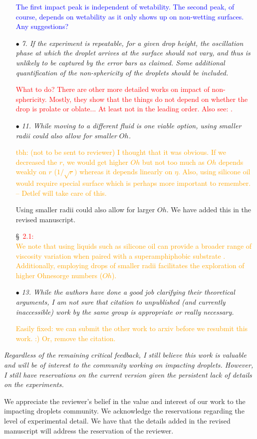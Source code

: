 \documentclass[]{article}
\newcommand*\blue{\textcolor{blue}}
\newcommand*\red{\textcolor{red}}
\newcommand{\VS}[1]{{\textcolor{orange}{#1}}}
\begin{document}
\begin{enumerate}
	\blue{The first impact peak is independent of wetability. The second peak, of course, depends on wetability as it only shows up on non-wetting surfaces. Any suggestions?}
	
	\item[$\bullet$] \textit{7. If the experiment is repeatable, for a given drop height, the oscillation phase at which the droplet arrives at the surface should not vary, and thus is unlikely to be captured by the error bars as claimed. Some additional quantification of the non-sphericity of the droplets should be included.}
	
	\red{What to do? There are other more detailed works on impact of non-sphericity. Mostly, they show that the things do not depend on whether the drop is prolate or oblate... At least not in the leading order. Also see: \citet{sanjay2023drop}.}
	
	\item[$\bullet$] \textit{11. While moving to a different fluid is one viable option, using smaller radii could also allow for smaller $Oh$.}
	
	\VS{tbh: (not to be sent to reviewer) I thought that it was obvious. If we decreased the $r$, we would get higher $Oh$ but not too much as $Oh$ depends weakly on $r$ ($1/\sqrt{r})$ whereas it depends linearly on $\eta$. Also, using silicone oil would require special surface which is perhaps more important to remember. -- Detlef will take care of this.}

	Using smaller radii could also allow for larger $Oh$. We have added this in the revised manuscript. 
	
	\S~\red{2.1:}\\
	\VS{We note that using liquids such as silicone oil can provide a broader range of viscosity variation when paired with a superamphiphobic substrate \citep{deng2012candle}. Additionally, employing drops of smaller radii facilitates the exploration of higher Ohnesorge numbers ($Oh$).}
	
	\item[$\bullet$] \textit{13. While the authors have done a good job clarifying their theoretical arguments, I am not sure that citation to unpublished (and currently inaccessible) work by the same group is appropriate or really necessary.}
	
	\VS{Easily fixed: we can submit the other work to arxiv before we resubmit this work. :) Or, remove the citation.}
	
\end{enumerate}

\textit{Regardless of the remaining critical feedback, I still believe this work is valuable and will be of interest to the community working on impacting droplets. However, I still have reservations on the current version given the persistent lack of details on the experiments.}

We appreciate the reviewer's belief in the value and interest of our work to the impacting droplets community. We acknowledge the reservations regarding the level of experimental detail. We have that the details added in the revised manuscript will address the reservation of the reviewer. 
	
\printbibliography[title=References]
\end{document}
